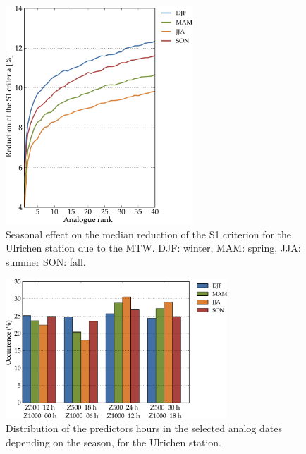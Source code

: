 \documentclass[hess, manuscript]{copernicus}
\begin{document}
\begin{figure}[htb]
	\begin{center}
		\includegraphics[width=7cm]{figures/changes_S1_seasons.pdf}
	\end{center}
	\caption{Seasonal effect on the median reduction of the S1 criterion for the Ulrichen station due to the MTW. DJF: winter, MAM: spring, JJA: summer SON: fall.}
	\label{fig:changes_S1_seasons}
\end{figure}

\begin{figure}[htb]
	\includegraphics[width=8.3cm]{figures/hours_selection_per_season.pdf}
	\caption{Distribution of the predictors hours in the selected analog dates depending on the season, for the Ulrichen station.}
	\label{fig:hours_selection_per_season}
\end{figure}
\end{document}
